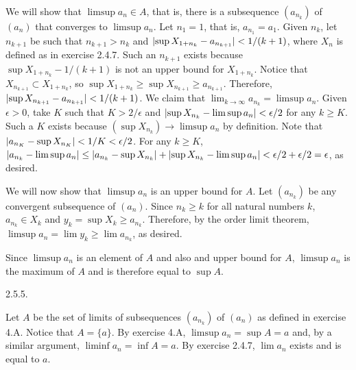 We will show that $\limsup a_n \in A$, that is,
there is a subsequence $(a_{n_k})$ of $(a_n)$
that converges to $\limsup a_n$.
Let $n_1 = 1$, that is, $a_{n_1} = a_1$.
Given $n_k$, let $n_{k + 1}$ be such that
$n_{k + 1} > n_k$ and $\vert{\sup X_{1 + n_k} - a_{n_{k + 1}}}\vert < 1/(k + 1)$,
where $X_n$ is defined as in exercise 2.4.7.
Such an $n_{k + 1}$ exists because $\sup X_{1 + n_k} - 1/(k + 1)$
is not an upper bound for $X_{1 + n_k}$.
Notice that $X_{n_{k + 1}} \subset X_{1 + n_k}$,
so $\sup X_{1 + n_k} \ge \sup X_{n_{k + 1}} \ge a_{n_{k + 1}}$.
Therefore, $\vert{\sup X_{n_{k + 1}} - a_{n_{k + 1}}}\vert < 1/(k + 1)$.
We claim that $\lim _{k \to \infty} a_{n_k} = \limsup a_n$.
Given $\epsilon > 0$, take $K$ such that $K > 2 / \epsilon$
and $\vert{\sup X_{n_k} - \limsup a_n}\vert < \epsilon/2$ for any $k \ge K$.
Such a $K$ exists because $(\sup X_{n_k}) \to \limsup a_n$ by definition.
Note that $\vert{a_{n_K} - \sup X_{n_K}}\vert < 1/K < \epsilon/2$.
For any $k \ge K$, $\vert{a_{n_k} - \limsup a_n}\vert \le
\vert{a_{n_k} - \sup X_{n_k}}\vert + \vert{\sup X_{n_k} - \limsup a_n}\vert <
\epsilon/2 + \epsilon/2 = \epsilon$, as desired.

We will now show that $\limsup a_n$ is an upper bound for $A$.
Let $(a_{n_k})$ be any convergent subsequence of $(a_n)$.
Since $n_k \ge k$ for all natural numbers $k$,
$a_{n_k} \in X_k$ and $y_k = \sup X_k \ge a_{n_k}$.
Therefore, by the order limit theorem,
$\limsup a_n = \lim y_k \ge \lim a_{n_k}$, as desired.

Since $\limsup a_n$ is an element of $A$ and also and upper bound for $A$,
$\limsup a_n$ is the maximum of $A$ and is therefore equal to $\sup A$.
\bigskip
\item{2.5.5.}

Let $A$ be the set of limits of subsequences $(a_{n_k})$ of $(a_n)$
as defined in exercise 4.A.
Notice that $A = \{a\}$.
By exercise 4.A, $\limsup a_n = \sup A = a$ and,
by a similar argument, $\liminf a_n = \inf A = a$.
By exercise 2.4.7, $\lim a_n$ exists and is equal to $a$.
\bye
